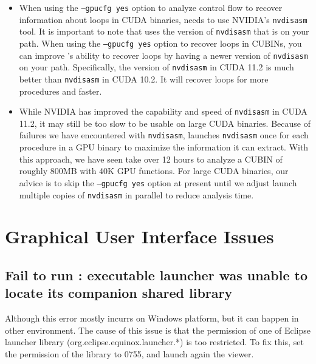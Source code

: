 \documentclass[11pt,twoside,letterpaper]{report}
\begin{document}
\begin{itemize}
\item
 When using the {\tt --gpucfg yes} option to analyze control flow to recover information about loops in CUDA binaries, \hpcstruct{} needs to use NVIDIA's {\tt nvdisasm} tool. It is important to note that \hpcstruct{} uses the version of {\tt nvdisasm} that is on your path. When using the {\tt --gpucfg yes} option to recover loops in CUBINs, you  can improve  \hpcstruct{}'s ability to recover loops by having a newer version of {\tt nvdisasm} on your path. Specifically, the version of {\tt nvdisasm} in CUDA 11.2  is much better than  {\tt nvdisasm} in CUDA 10.2. It will recover loops for more procedures and faster.
\item While NVIDIA has improved the capability and speed of {\tt nvdisasm} in CUDA 11.2, it may still be too slow to be usable on large CUDA binaries.  Because of failures we have encountered with {\tt nvdisasm},  \hpcstruct{} launches {\tt nvdisasm} once for each procedure in a GPU binary to maximize the information it can extract. With this approach, we have  seen  \hpcstruct{}   take over 12 hours to analyze a CUBIN of roughly 800MB with 40K GPU functions. For large CUDA binaries, our advice is to skip the {\tt --gpucfg yes} option at present until we adjust  \hpcstruct{} launch multiple copies of {\tt nvdisasm} in parallel to reduce analysis time.
\end{itemize}


\section{Graphical User Interface Issues}


\subsection{Fail to run \hpcviewer{}: executable launcher was unable to locate its companion shared library}

Although this error mostly incurrs on Windows platform, but it can happen in other environment.
The cause of this issue is that the permission of one of Eclipse launcher library (org.eclipse.equinox.launcher.*) is too restricted.
To fix this, set the permission of the library to 0755, and launch again the viewer.
\end{document}
